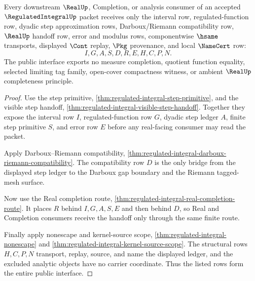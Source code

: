 \begin{theorem}
\label{thm:regulated-integral-public-interface}
Every downstream $\RealUp$, Completion, or analysis consumer of an accepted $\RegulatedIntegralUp$ packet receives only the interval row, regulated-function row, dyadic step approximation rows, Darboux/Riemann compatibility row, $\RealUp$ handoff row, error and modulus rows, componentwise $\hsame$ transports, displayed $\Cont$ replay, $\Pkg$ provenance, and local $\NameCert$ row:
$$
I,G,A,S,D,R,E,H,C,P,N .
$$
The public interface exports no measure completion, quotient function equality, selected limiting tag family, open-cover compactness witness, or ambient $\RealUp$ completeness principle.
\end{theorem}
\begin{proof}
Use the step primitive, \autoref{thm:regulated-integral-step-primitive}, and the visible step handoff, \autoref{thm:regulated-integral-visible-step-handoff}. Together they expose the interval row $I$, regulated-function row $G$, dyadic step ledger $A$, finite step primitive $S$, and error row $E$ before any real-facing consumer may read the packet.

Apply Darboux--Riemann compatibility, \autoref{thm:regulated-integral-darboux-riemann-compatibility}. The compatibility row $D$ is the only bridge from the displayed step ledger to the Darboux gap boundary and the Riemann tagged-mesh surface.

Now use the Real completion route, \autoref{thm:regulated-integral-real-completion-route}. It places $R$ behind $I,G,A,S,E$ and then behind $D$, so Real and Completion consumers receive the handoff only through the same finite route.

Finally apply nonescape and kernel-source scope, \autoref{thm:regulated-integral-nonescape} and \autoref{thm:regulated-integral-kernel-source-scope}. The structural rows $H,C,P,N$ transport, replay, source, and name the displayed ledger, and the excluded analytic objects have no carrier coordinate. Thus the listed rows form the entire public interface.
\end{proof}

